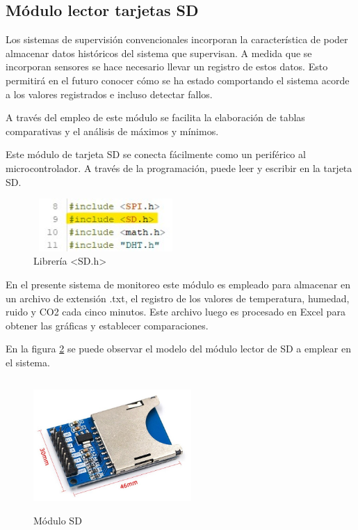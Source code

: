 \subsection{Módulo lector tarjetas SD}

Los sistemas de supervisión convencionales incorporan la característica de poder
almacenar datos históricos del sistema que supervisan. A medida que se incorporan sensores se hace necesario llevar un registro de estos datos. Esto permitirá en el futuro conocer cómo se ha
estado comportando el sistema acorde a los valores registrados e incluso detectar fallos. 

A través del empleo de este módulo se facilita la elaboración de tablas comparativas y el análisis de máximos y mínimos.

Este módulo de tarjeta SD se conecta fácilmente como un periférico al microcontrolador. A través de la programación, puede leer y escribir en la tarjeta SD.

\begin{figure}[H]
    \centering
    \includegraphics[width=5.5cm, height=2cm]{imagenes/libreria SD.jpg}
    \caption{Librería <SD.h>}
    \label{imag:libreria_SD}
\end{figure}

En el presente sistema de monitoreo este módulo es empleado para almacenar en un archivo de extensión .txt, el registro de los valores de temperatura, humedad, ruido y CO2 cada cinco minutos. Este archivo luego es procesado en Excel para obtener las 
gráficas y establecer comparaciones.

En la figura \ref{imag:modulo_SD} se puede observar el modelo del módulo lector de SD a emplear en el sistema.

\begin{figure}[H]
    \centering
    \includegraphics[width=6cm, height=5cm]{imagenes/modulo SD.jpg}
    \caption{Módulo SD}
    \label{imag:modulo_SD}
\end{figure}

